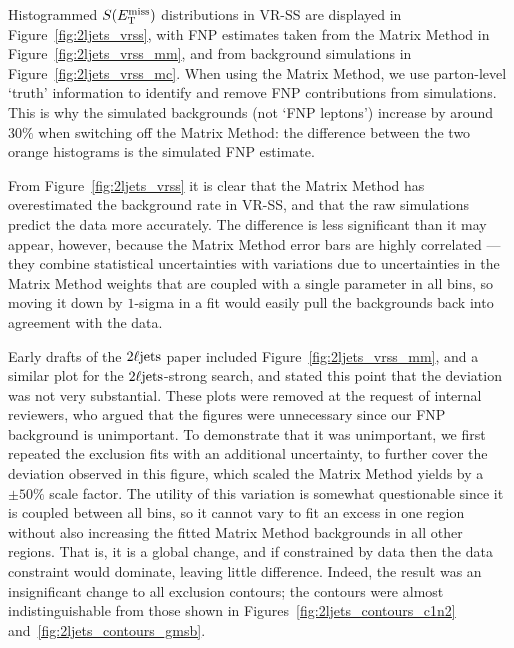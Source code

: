 Histogrammed $S(E_\mathrm{T}^\mathrm{miss})$ distributions in VR-SS are displayed in
Figure~\ref{fig:2ljets_vrss},
with FNP estimates taken from the Matrix Method in
Figure~\ref{fig:2ljets_vrss_mm},
and from background simulations in
Figure~\ref{fig:2ljets_vrss_mc}.
When using the Matrix Method, we use parton-level `truth' information to
identify and remove FNP contributions from simulations.
This is why the simulated backgrounds (not `FNP leptons') increase by around
$30\%$ when switching off the Matrix Method: the difference between the
two orange histograms is the simulated FNP estimate.

From Figure~\ref{fig:2ljets_vrss} it is clear that the Matrix Method has
overestimated the background rate in VR-SS, and that the raw simulations
predict the data more accurately.
The difference is less significant than it may appear, however,
because the Matrix Method error bars are highly correlated --- they combine
statistical uncertainties with variations due to uncertainties in the
Matrix Method weights that are coupled with a single parameter in all bins,
so moving it down by $1$-sigma in a fit would easily pull the backgrounds back
into agreement with the data.

Early drafts of the $2\ell\mathrm{jets}$ paper included
Figure~\ref{fig:2ljets_vrss_mm}, and a similar plot for the
$2\ell\mathrm{jets}$-strong search, and stated this point that the deviation was not
very substantial.
These plots were removed at the request of internal reviewers, who argued that
the figures were unnecessary since our FNP background is unimportant.
To demonstrate that it was unimportant, we first repeated the exclusion fits
with an additional uncertainty, to further cover the deviation observed in this
figure, which scaled the Matrix Method yields by a $\pm 50\%$ scale factor.
The utility of this variation is somewhat questionable since it is coupled
between all bins, so it cannot vary to fit an excess in one region
without also increasing the fitted Matrix Method backgrounds in all other
regions.
That is, it is a global change, and if constrained by data then the data
constraint would dominate, leaving little difference.
Indeed, the result was an insignificant change to all exclusion contours;
the contours were almost indistinguishable from those shown in
Figures~\ref{fig:2ljets_contours_c1n2} and~\ref{fig:2ljets_contours_gmsb}.

